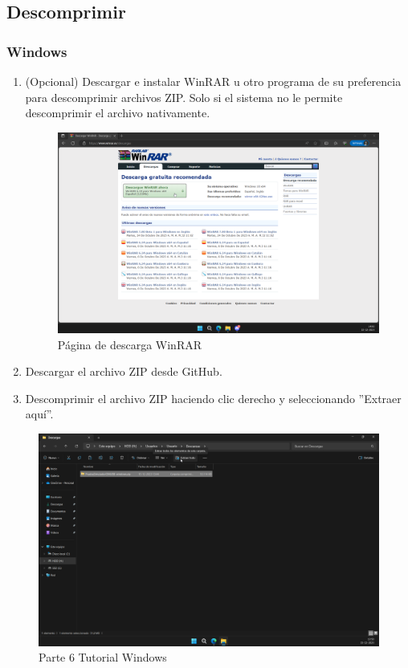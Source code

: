 \subsection*{Descomprimir}

\subsubsection*{Windows}

\begin{enumerate}[label=\arabic*.-]
    \item (Opcional) Descargar e instalar WinRAR u otro programa de su preferencia para descomprimir archivos ZIP. Solo si el sistema no le permite descomprimir el archivo nativamente.
    \begin{figure}[ht]
        \centering
        \includegraphics[width=13cm]{figures/TutorialWindows/winrar.png}
        \caption{Página de descarga WinRAR}
        \label{fig:winrar}
    \end{figure}
    \item Descargar el archivo ZIP desde GitHub.
    \item Descomprimir el archivo ZIP haciendo clic derecho y seleccionando ''Extraer aquí''.
\end{enumerate}

\begin{figure}[ht]
    \centering
    \includegraphics[width=13cm]{figures/TutorialWindows/tutorial (6).png}
    \caption{Parte 6 Tutorial Windows}
    \label{fig:tutowin6}
\end{figure}

